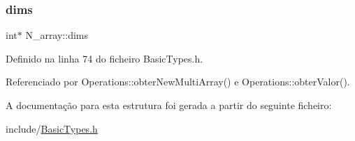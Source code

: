 \mbox{\label{structN__array_ac4bcc6ba8cf97045350bdfbf7d25eaa0}} 
\subsubsection{\texorpdfstring{dims}{dims}}
{\footnotesize\ttfamily int$\ast$ N\+\_\+array\+::dims}



Definido na linha 74 do ficheiro Basic\+Types.\+h.



Referenciado por Operations\+::obter\+New\+Multi\+Array() e Operations\+::obter\+Valor().



A documentação para esta estrutura foi gerada a partir do seguinte ficheiro\+:\begin{DoxyCompactItemize}
\item 
include/\hyperlink{BasicTypes_8h}{Basic\+Types.\+h}\end{DoxyCompactItemize}
